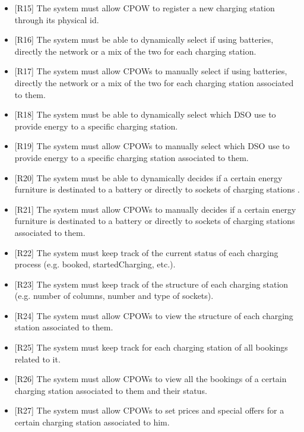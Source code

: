 \documentclass[a4paper]{report}
\begin{document}
\begin{itemize}
    \item{[R15]} \label{R15} The system must allow CPOW to register a new charging station through its physical id.
    \item{[R16]} \label{R16} The system must be able to dynamically select if using batteries, directly the network or a mix of the two for each charging station. 
    \item{[R17]} \label{R17} The system must allow CPOWs to manually select if using batteries, directly the network or a mix of the two for each charging station associated to them. 
    \item{[R18]} \label{R18} The system must be able to dynamically select which DSO use to provide energy to a specific charging station.
    \item{[R19]} \label{R19} The system must allow CPOWs to manually select which DSO use to provide energy to a specific charging station associated to them.
    \item{[R20]} \label{R20} The system must be able to dynamically decides if a certain energy furniture is destinated to a battery or directly to sockets of charging stations .
    \item{[R21]} \label{R21} The system must allow CPOWs to manually decides if a certain energy furniture is destinated to a battery or directly to sockets of charging stations associated to them.
    \item{[R22]} \label{R22} The system must keep track of the current status of each charging process (e.g. booked, startedCharging, etc.).
    \item{[R23]} \label{R23} The system must keep track of the structure of each charging station (e.g. number of columns, number and type of sockets).
    \item{[R24]} \label{R24} The system must allow CPOWs to view the structure of each charging station associated to them.
    \item{[R25]} \label{R25} The system must keep track for each charging station of all bookings related to it.
    \item{[R26]} \label{R26} The system must allow CPOWs to view all the bookings of a certain charging station associated to them and their status.
    \item{[R27]} \label{R27} The system must allow CPOWs to set prices and special offers for a certain charging station associated to him.
\end{itemize}
\end{document}
